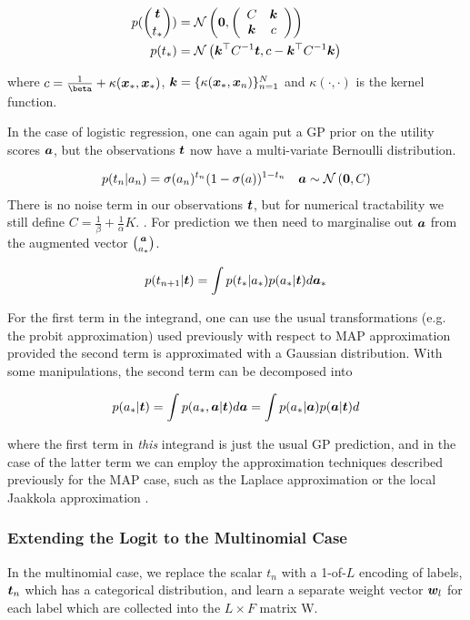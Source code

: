 \begin{align}
p(\binom{\bm t}{t_*}) & = \mathcal{N} \left( {\bm 0}, {\left(\begin{array}{cc} C & \bm k \\ \bm k & c\end{array}\right)} \right) \\
p(t_*) & = \mathcal{N} \left( {\bm k^\top {C}^{-1} \bm t}, {c - \bm k^\top {C}^{-1} \bm k} \right)
\end{align}

where $c = \frac{1}{\beta} + \kappa (\vv{x}_*, \vv{x}_*)$, $\bm k = \{\kappa(\bm x_*, \bm x_n)\}_{n=1}^{N}$ and $\kappa(\cdot, \cdot)$ is the kernel function.

In the case of logistic regression, one can again put a GP prior on the utility scores $\bm a$, but the observations $\bm t$ now have a multi-variate Bernoulli distribution.

\begin{align}
p(t_n|a_n) & = \sigma(a_n)^{t_n}(1 - \sigma(a))^{1-t_n} & \bm a \sim \mathcal{N} \left( {\bm 0}, {C} \right)
\end{align}
There is no noise term in our observations $\bm t$, but for numerical tractability we still define $C=\frac{1}{\beta} + \frac{1}{\alpha}K$.
. For prediction we then need to marginalise out $\bm a$ from the augmented vector $\binom{\bm a}{a_*}$.

\begin{equation}
p(t_{n+1} | \bm t) = \int p(t_* | a_*) p (a_* | \bm t) d\bm a_*
\end{equation}

For the first term in the integrand, one can use the usual transformations (e.g. the probit approximation) used previously with respect to MAP approximation provided the second term is approximated with a Gaussian distribution. With some manipulations, the second term can be decomposed into

\begin{equation}
p(a_* | \bm t) = \int p(a_*, \bm a | \bm t) d\bm a  = \int p(a_* | \bm a) p(\bm a | \bm t) d
\end{equation}

where the first term in \emph{this} integrand is just the usual GP prediction, and in the case of the latter term we can employ the approximation techniques described previously for the MAP case, such as the Laplace approximation \cite{WilliamsBarber1998} or the local Jaakkola approximation \cite{Gibbs2000}.


\subsubsection{Extending the Logit to the Multinomial Case}
In the multinomial case, we replace the scalar $t_n$ with a 1-of-$L$ encoding of labels, $\bm t_n$ which has a categorical distribution, and learn a separate weight vector $\bm w_l$ for each label which are collected into the $L \times F$ matrix W. 

